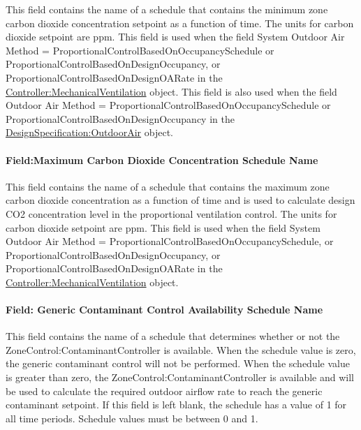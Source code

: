 This field contains the name of a schedule that contains the minimum zone carbon dioxide concentration setpoint as a function of time. The units for carbon dioxide setpoint are ppm. This field is used when the field System Outdoor Air Method = ProportionalControlBasedOnOccupancySchedule or ProportionalControlBasedOnDesignOccupancy, or ProportionalControlBasedOnDesignOARate in the \hyperref[controllermechanicalventilation]{Controller:MechanicalVentilation} object. This field is also used when the field Outdoor Air Method = ProportionalControlBasedOnOccupancySchedule or ProportionalControlBasedOnDesignOccupancy in the \hyperref[designspecificationoutdoorair]{DesignSpecification:OutdoorAir} object.

\paragraph{Field:Maximum Carbon Dioxide Concentration Schedule Name}\label{fieldmaximum-carbon-dioxide-concentration-schedule-name}

This field contains the name of a schedule that contains the maximum zone carbon dioxide concentration as a function of time and is used to calculate design CO2 concentration level in the proportional ventilation control. The units for carbon dioxide setpoint are ppm. This field is used when the field System Outdoor Air Method = ProportionalControlBasedOnOccupancySchedule, or ProportionalControlBasedOnDesignOccupancy, or ProportionalControlBasedOnDesignOARate in the \hyperref[controllermechanicalventilation]{Controller:MechanicalVentilation} object.

\paragraph{Field: Generic Contaminant Control Availability Schedule Name}\label{field-generic-contaminant-control-availability-schedule-name}

This field contains the name of a schedule that determines whether or not the ZoneControl:ContaminantController is available. When the schedule value is zero, the generic contaminant control will not be performed. When the schedule value is greater than zero, the ZoneControl:ContaminantController is available and will be used to calculate the required outdoor airflow rate to reach the generic contaminant setpoint. If this field is left blank, the schedule has a value of 1 for all time periods. Schedule values must be between 0 and 1.

